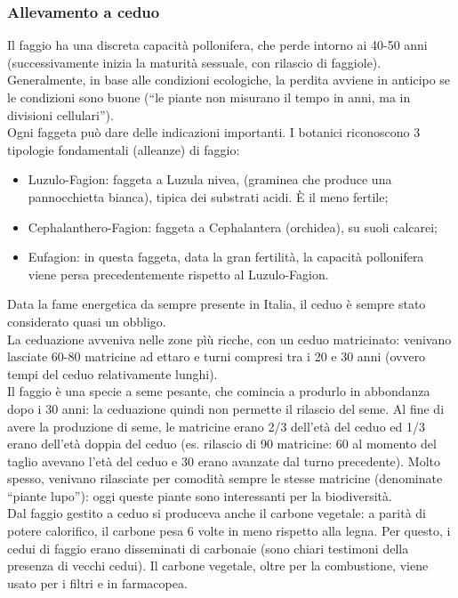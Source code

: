 \subsubsection{Allevamento a ceduo}
Il faggio ha una discreta capacità pollonifera, che perde intorno ai 40-50 anni (successivamente inizia la maturità sessuale, con rilascio di faggiole). Generalmente, in base alle condizioni ecologiche, la perdita avviene in anticipo se le condizioni sono buone (``le piante non misurano il tempo in anni, ma in divisioni cellulari'').\\
Ogni faggeta può dare delle indicazioni importanti. I botanici riconoscono 3 tipologie fondamentali (alleanze) di faggio: 
\begin{itemize}[nosep]
    \item Luzulo-Fagion: faggeta a Luzula nivea, (graminea che produce una pannocchietta bianca), tipica dei substrati acidi. È il meno fertile;
    \item Cephalanthero-Fagion: faggeta a Cephalantera (orchidea), su suoli calcarei;
    \item Eufagion: in questa faggeta, data la gran fertilità, la capacità pollonifera viene persa precedentemente rispetto al Luzulo-Fagion.
\end{itemize}
Data la fame energetica da sempre presente in Italia, il ceduo è sempre stato considerato quasi un obbligo.\\
La ceduazione avveniva nelle zone pìù ricche, con un ceduo matricinato: venivano lasciate 60-80 matricine ad ettaro e turni compresi tra i 20 e 30 anni (ovvero tempi del ceduo relativamente lunghi).\\
Il faggio è una specie a seme pesante, che comincia a produrlo in abbondanza dopo i 30 anni: la ceduazione quindi non permette il rilascio del seme. Al fine di avere la produzione di seme, le matricine erano 2/3 dell'età del ceduo ed 1/3 erano dell'età doppia del ceduo (es. rilascio di 90 matricine: 60 al momento del taglio avevano l'età del ceduo e 30 erano avanzate dal turno precedente). Molto spesso, venivano rilasciate per comodità sempre le stesse matricine (denominate ``piante lupo''): oggi queste piante sono interessanti per la biodiversità.\\
Dal faggio gestito a ceduo si produceva anche il carbone vegetale: a parità di potere calorifico, il carbone pesa 6 volte in meno rispetto alla legna. Per questo, i cedui di faggio erano disseminati di carbonaie (sono chiari testimoni della presenza di vecchi cedui). Il carbone vegetale, oltre per la combustione, viene usato per i filtri e in farmacopea.\\
